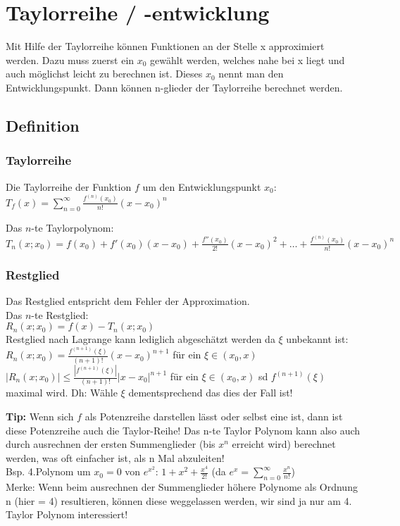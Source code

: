 \section{Taylorreihe / -entwicklung}
Mit Hilfe der Taylorreihe können Funktionen an der Stelle x approximiert werden. Dazu muss zuerst ein $x_0$ gewählt werden, welches nahe bei x liegt und auch möglichst leicht zu berechnen ist. Dieses $x_0$ nennt man den Entwicklungspunkt. Dann können n-glieder der Taylorreihe berechnet werden.

\subsection{Definition}
\subsubsection{Taylorreihe}
Die Taylorreihe der Funktion $f$ um den Entwicklungspunkt $x_0$:\newline
$T_f (x) = \sum_{n = 0}^\infty \frac{f^{(n)}(x_0)}{n!}(x - x_0)^n$\newline

Das $n$-te Taylorpolynom:\newline
{\footnotesize
$T_n (x; x_0) = f(x_0) + f'(x_0)(x-x_0) + \frac{f''(x_0)}{2!}(x-x_0)^2 + \ldots + \frac{f^{(n)}(x_0)}{n!}(x-x_0)^n$
}

\subsubsection{Restglied}
{\small
Das Restglied entspricht dem Fehler der Approximation.\\
Das $n$-te Restglied: \\
$R_n (x; x_0) = f(x) - T_n (x; x_0)$\\

Restglied nach Lagrange kann lediglich abgeschätzt werden da $\xi$ unbekannt ist: \\
$R_n (x; x_0) = \frac{f^{(n+1)}(\xi)}{(n+1)!} (x-x_0)^{n+1}$ für ein $\xi \in (x_0, x)$ \\
$|R_n (x; x_0)| \leq \frac{|f^{(n+1)}(\xi)|}{(n+1)!} |x-x_0|^{n+1}$ für ein $\xi \in (x_0, x)$ sd $f^{(n+1)}(\xi)$ maximal wird. Dh: Wähle $\xi$ dementsprechend das dies der Fall ist!
}

{\small
\textbf{Tip:} Wenn sich $f$ als Potenzreihe darstellen lässt oder selbst eine ist, dann ist diese Potenzreihe auch die Taylor-Reihe! Das n-te Taylor Polynom kann also auch durch ausrechnen der ersten Summenglieder (bis $x^n$ erreicht wird) berechnet 
werden, was oft einfacher ist, als n Mal abzuleiten!\\
Bsp. 4.Polynom um $x_0 = 0$ von $e^{x^2}$:  $1 + x^2 + \frac{x^4}{2!}$  (da $e^x = \sum_{n = 0}^\infty \frac{x^n}{n!}$)\\
Merke: Wenn beim ausrechnen der Summenglieder höhere Polynome als Ordnung n (hier = 4) resultieren, können diese weggelassen werden, wir sind ja nur am 4. Taylor Polynom interessiert!
}

